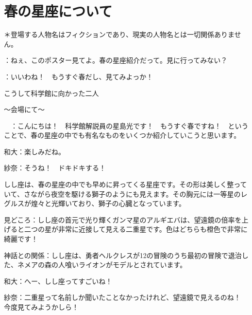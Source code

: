 \documentclass[../../super_nova_2023]{subfiles}
\begin{document}
\chapter{春の星座について}
＊登場する人物名はフィクションであり、現実の人物名とは一切関係ありません。


\phantom{a}\par
{}：ねぇ、このポスター見てよ。春の星座紹介だって。見に行ってみない？


\phantom{a}\par
{}：いいわね！　もうすぐ春だし、見てみよっか！　


\phantom{a}\par
こうして科学館に向かった二人


\phantom{a}\par
〜会場にて〜


\phantom{a}\par
{}　：こんにちは！　科学館解説員の星島光です！　もうすぐ春ですね！　ということで、春の星座の中でも有名なものをいくつか紹介していこうと思います。


\phantom{a}\par
和大：楽しみだね。


\phantom{a}\par
紗奈：そうね！　ドキドキする！


\phantom{a}\par
{}
{}
\begin{tcolorbox}[title=1. しし座, breakable]
	しし座は、春の星座の中でも早めに昇ってくる星座です。その形は美しく整っていて、さながら夜空を駆ける獅子のようにも見えます。その胸元には一等星のレグルスが煌々と光輝いており、獅子の心臓となっています。
	
	
	\phantom{a}\par
	見どころ：しし座の首元で光り輝くガンマ星のアルギエバは、望遠鏡の倍率を上げると二つの星が非常に近接して見える二重星です。色はどちらも橙色で非常に綺麗です！
	
	
	\phantom{a}\par
	神話との関係：しし座は、勇者ヘルクレスが12の冒険のうち最初の冒険で退治した、ネメアの森の人喰いライオンがモデルとされています。  
\end{tcolorbox}

\phantom{a}\par
和大：へー、しし座ってすごいね！


\phantom{a}\par
紗奈：二重星って名前しか聞いたことなかったけれど、望遠鏡で見えるのね！　今度見てみようかしら！
\end{document}
